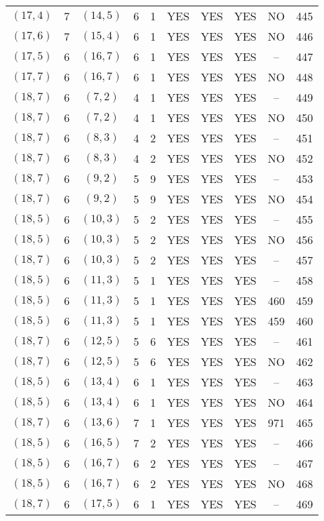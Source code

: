 \begin{longtable}{|c|c|c|c|c|c|c|c|c|c|}
$(17, 4)$ & 7 & $(14, 5)$ & 6 & 1 & YES & YES & YES & NO & 445\\
$(17, 6)$ & 7 & $(15, 4)$ & 6 & 1 & YES & YES & YES & NO & 446\\
$(17, 5)$ & 6 & $(16, 7)$ & 6 & 1 & YES & YES & YES & -- & 447\\
$(17, 7)$ & 6 & $(16, 7)$ & 6 & 1 & YES & YES & YES & NO & 448\\
$(18, 7)$ & 6 & $(7, 2)$ & 4 & 1 & YES & YES & YES & -- & 449\\
$(18, 7)$ & 6 & $(7, 2)$ & 4 & 1 & YES & YES & YES & NO & 450\\
$(18, 7)$ & 6 & $(8, 3)$ & 4 & 2 & YES & YES & YES & -- & 451\\
$(18, 7)$ & 6 & $(8, 3)$ & 4 & 2 & YES & YES & YES & NO & 452\\
$(18, 7)$ & 6 & $(9, 2)$ & 5 & 9 & YES & YES & YES & -- & 453\\
$(18, 7)$ & 6 & $(9, 2)$ & 5 & 9 & YES & YES & YES & NO & 454\\
$(18, 5)$ & 6 & $(10, 3)$ & 5 & 2 & YES & YES & YES & -- & 455\\
$(18, 5)$ & 6 & $(10, 3)$ & 5 & 2 & YES & YES & YES & NO & 456\\
$(18, 7)$ & 6 & $(10, 3)$ & 5 & 2 & YES & YES & YES & -- & 457\\
$(18, 5)$ & 6 & $(11, 3)$ & 5 & 1 & YES & YES & YES & -- & 458\\
$(18, 5)$ & 6 & $(11, 3)$ & 5 & 1 & YES & YES & YES & 460 & 459\\
$(18, 5)$ & 6 & $(11, 3)$ & 5 & 1 & YES & YES & YES & 459 & 460\\
$(18, 7)$ & 6 & $(12, 5)$ & 5 & 6 & YES & YES & YES & -- & 461\\
$(18, 7)$ & 6 & $(12, 5)$ & 5 & 6 & YES & YES & YES & NO & 462\\
$(18, 5)$ & 6 & $(13, 4)$ & 6 & 1 & YES & YES & YES & -- & 463\\
$(18, 5)$ & 6 & $(13, 4)$ & 6 & 1 & YES & YES & YES & NO & 464\\
$(18, 7)$ & 6 & $(13, 6)$ & 7 & 1 & YES & YES & YES & 971 & 465\\
$(18, 5)$ & 6 & $(16, 5)$ & 7 & 2 & YES & YES & YES & -- & 466\\
$(18, 5)$ & 6 & $(16, 7)$ & 6 & 2 & YES & YES & YES & -- & 467\\
$(18, 5)$ & 6 & $(16, 7)$ & 6 & 2 & YES & YES & YES & NO & 468\\
$(18, 7)$ & 6 & $(17, 5)$ & 6 & 1 & YES & YES & YES & -- & 469\\

\end{longtable}
